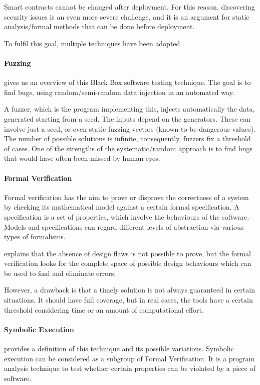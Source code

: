 Smart contracts cannot be changed after deployment. 
For this reason, discovering security issues is an even more severe challenge, and it is an argument for static analysis/formal methods that can be done before deployment.

To fulfil this goal, multiple techniques have been adopted.

\paragraph{Fuzzing} \citet{OWASPFuzz} gives us an overview of this Black Box software testing technique. 
The goal is to find bugs, using random/semi-random data injection in an automated way. 

A fuzzer, which is the program implementing this, injects automatically the data, generated starting from a seed. The inputs depend on the generators. 
These can involve just a seed, or even static fuzzing vectors (known-to-be-dangerous values).
The number of possible solutions is infinite, consequently, fuzzers fix a threshold of cases.
One of the strengths of the systematic/random approach is to find bugs that would have often been missed by human eyes.

\paragraph{Formal Verification} Formal verification has the aim to prove or disprove the correctness of a system by checking its mathematical model
against a certain formal specification. A specification is a set of properties, which involve the
behaviours of the software. Models and specifications can regard different levels of abstraction via various types of formalisms.

\cite{FormalVerificationDef} explains that the absence of design flaws is not possible to prove, but the formal verification looks 
for the complete space of possible design behaviours which can be used to find and eliminate errors.

However, a drawback is that a timely solution is not always guaranteed in certain situations. It should have full coverage, but 
in real cases, the tools have a certain threshold considering time or an amount of computational effort.


\paragraph{Symbolic Execution} \citet{SymbolicExecution} provides a definition of this technique and its possible variations. 
Symbolic execution can be considered as a subgroup of Formal Verification. 
It is a program analysis technique to test
whether certain properties can be violated by a piece of software. 

